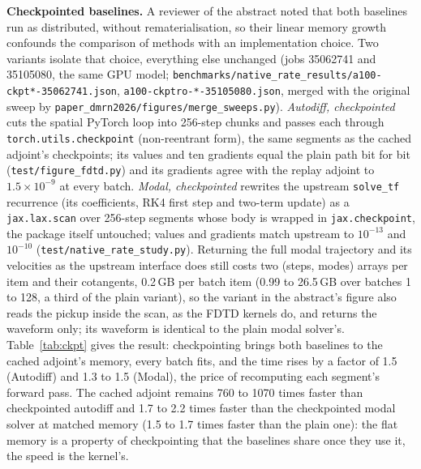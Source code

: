 \documentclass[a4paper,10pt]{article}
\begin{document}
\textbf{Checkpointed baselines.} A reviewer of the abstract noted that both baselines run as distributed, without rematerialisation, so their linear memory growth confounds the comparison of methods with an implementation choice. Two variants isolate that choice, everything else unchanged (jobs 35062741 and 35105080, the same GPU model; \texttt{benchmarks/native\_rate\_results/a100-ckpt*-35062741.json}, \texttt{a100-ckptro-*-35105080.json}, merged with the original sweep by \texttt{paper\_dmrn2026/figures/merge\_sweeps.py}). \emph{Autodiff, checkpointed} cuts the spatial PyTorch loop into 256-step chunks and passes each through \texttt{torch.utils.checkpoint} (non-reentrant form), the same segments as the cached adjoint's checkpoints; its values and ten gradients equal the plain path bit for bit (\texttt{test/figure\_fdtd.py}) and its gradients agree with the replay adjoint to $1.5\times10^{-9}$ at every batch. \emph{Modal, checkpointed} rewrites the upstream \texttt{solve\_tf} recurrence (its coefficients, RK4 first step and two-term update) as a \texttt{jax.lax.scan} over 256-step segments whose body is wrapped in \texttt{jax.checkpoint}, the package itself untouched; values and gradients match upstream to $10^{-13}$ and $10^{-10}$ (\texttt{test/native\_rate\_study.py}). Returning the full modal trajectory and its velocities as the upstream interface does still costs two (steps, modes) arrays per item and their cotangents, 0.2\,GB per batch item (0.99 to 26.5\,GB over batches 1 to 128, a third of the plain variant), so the variant in the abstract's figure also reads the pickup inside the scan, as the FDTD kernels do, and returns the waveform only; its waveform is identical to the plain modal solver's. Table~\ref{tab:ckpt} gives the result: checkpointing brings both baselines to the cached adjoint's memory, every batch fits, and the time rises by a factor of 1.5 (Autodiff) and 1.3 to 1.5 (Modal), the price of recomputing each segment's forward pass. The cached adjoint remains 760 to 1070 times faster than checkpointed autodiff and 1.7 to 2.2 times faster than the checkpointed modal solver at matched memory (1.5 to 1.7 times faster than the plain one): the flat memory is a property of checkpointing that the baselines share once they use it, the speed is the kernel's.
\end{document}
